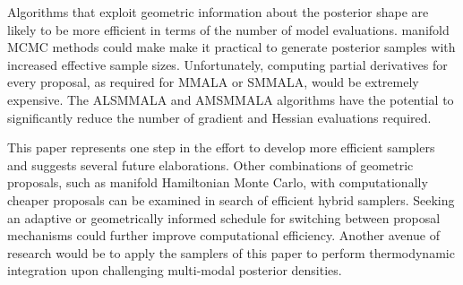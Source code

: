 \documentclass[twoside,11pt]{article}
\begin{document}
Algorithms that exploit geometric information about the posterior shape are likely to be more efficient in terms of the 
number of model evaluations. manifold MCMC methods could make make it practical to generate posterior samples with increased 
effective sample sizes. Unfortunately, computing partial derivatives for every proposal, as required for MMALA or SMMALA, 
would be extremely expensive. The ALSMMALA and AMSMMALA algorithms have the potential to significantly reduce the number of 
gradient and Hessian evaluations required.  

This paper represents one step in the effort to develop more efficient samplers and suggests several future elaborations.  
Other combinations of geometric proposals, such as manifold Hamiltonian Monte Carlo, with computationally cheaper proposals 
can be examined in search of efficient hybrid samplers. Seeking an adaptive or geometrically informed schedule for switching 
between proposal mechanisms could further improve computational efficiency. Another avenue of research would be to apply the 
samplers of this paper to perform thermodynamic integration upon challenging multi-modal posterior densities.   


\newpage



\newpage

\vskip 0.2in

\end{document}
